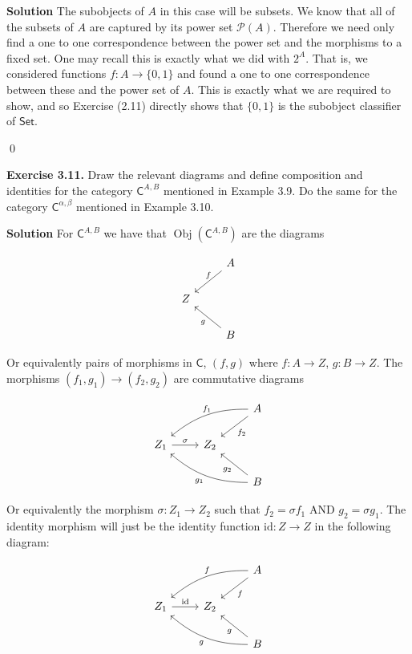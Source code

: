 \documentclass[titlepage]{article}
\newcommand{\Exercise}[1]{\textbf{Exercise #1}}
\newcommand{\Solution}{\textbf{Solution }}
\newcommand{\cat}[1]{\mathsf{#1}}
\newcommand{\Cat}{\cat{C}}
\DeclareMathOperator{\Obj}{Obj}
\begin{document}
\Solution The subobjects of $A$ in this case will be subsets. We know that all of the subsets of $A$ are captured by its power set $\mathscr{P}(A)$. Therefore we need only find a one to one correspondence between the power set and the morphisms to a fixed set. One may recall this is exactly what we did with $2^A$. That is, we considered functions $f:A \to \{0,1\}$ and found a one to one correspondence between these and the power set of $A$. This is exactly what we are required to show, and so Exercise (2.11) directly shows that $\{0,1\}$ is the subobject classifier of $\cat{Set}$.

\qed

\bigskip

\Exercise{3.11.} Draw the relevant diagrams and define composition and identities for the category $\Cat^{A,B}$ mentioned in Example 3.9. Do the same for the category $\Cat^{\alpha,\beta}$ mentioned in Example 3.10.

\Solution For $\Cat^{A,B}$ we have that $\Obj(\Cat^{A,B})$ are the diagrams

\[
\begin{tikzcd}[column sep=small]
    & & A \arrow[lld,"f" above] \\ Z \\ & & B \arrow[llu, "g"]
\end{tikzcd}\]

Or equivalently pairs of morphisms in $\Cat$, $(f,g)$ where $f:A \to Z$, $g:B \to Z$. The morphisms $(f_1,g_1) \to (f_2,g_2)$ are commutative diagrams

\[
\begin{tikzcd}
    & & A \arrow[lld, "f_1" above, bend right=20] \arrow[ld,"f_2"] \\ Z_1 \arrow[r, "\sigma"] & Z_2 & \\ & & B \arrow[llu,"g_1", bend left=20] \arrow[lu, "g_2"]
\end{tikzcd}\]

Or equivalently the morphism $\sigma:Z_1 \to Z_2$ such that $f_2=\sigma f_1$ AND $g_2 =\sigma g_1$. The identity morphism will just be the identity function $\text{id}:Z \to Z$ in the following diagram:

\[
\begin{tikzcd}
    & & A \arrow[lld, "f" above, bend right=20] \arrow[ld,"f"] \\ Z_1 \arrow[r, "\text{id}"] & Z_2 & \\ & & B \arrow[llu,"g", bend left=20] \arrow[lu, "g"]
\end{tikzcd}\]
\end{document}
